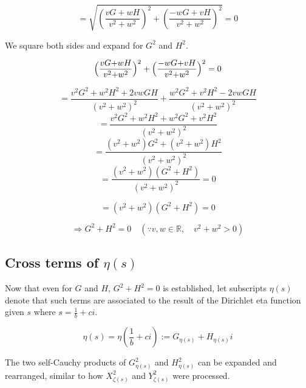 \documentclass{amsart}
\begin{document}
	\[ = \sqrt{(\frac{vG{+}wH}{v^2{+}w^2})^2 + (\frac{-wG{+}vH}{v^2{+}w^2})^2} = 0 \]
	
	We square both sides and expand for $G^2$ and $H^2$.
	
	\[ \Bigl(\frac{vG{+}wH}{v^2{+}w^2}\Bigr)^2 + \Bigl(\frac{-wG{+}vH}{v^2{+}w^2}\Bigr)^2 = 0 \]
	
	\[ = \frac{v^2G^2 + w^2H^2 + 2vwGH}{(v^2+w^2)^2} + \frac{w^2G^2 + v^2H^2 - 2vwGH}{(v^2+w^2)^2} \]
	\[ = \frac{v^2G^2 + w^2H^2 + w^2G^2 + v^2H^2}{(v^2+w^2)^2} \]
	\[ = \frac{(v^2+w^2)G^2 + (v^2+w^2)H^2}{(v^2+w^2)^2} \]
	\[ = \frac{(v^2+w^2)(G^2 + H^2)}{(v^2+w^2)^2} = 0 \]
	
	\[ = (v^2+w^2)(G^2 + H^2) = 0 \]
	
	\[ \Rightarrow G^2 + H^2 = 0 \quad (\because v, w \in \mathbb{R}, \quad v^2 + w^2 > 0)  \]
	
	
	\subsection{Cross terms of $\eta(s)$}
	Now that even for $G$ and $H$, $G^2 + H^2 = 0$ is established, let subscripts $\eta(s)$ denote that such terms are associated to the result of the Dirichlet eta function given $s$ where $s=\frac{1}{b}+ci$.
	
	\[ \eta(s) = \eta(\frac{1}{b}+ci) := G_{\eta(s)}+H_{\eta(s)}i \]
	
	The two self-Cauchy products of $G_{\eta(s)}^2$ and $H_{\eta(s)}^2$ can be expanded and rearranged, similar to how $X_{\zeta(s)}^2$ and $Y_{\zeta(s)}^2$ were processed.
	
\end{document}
